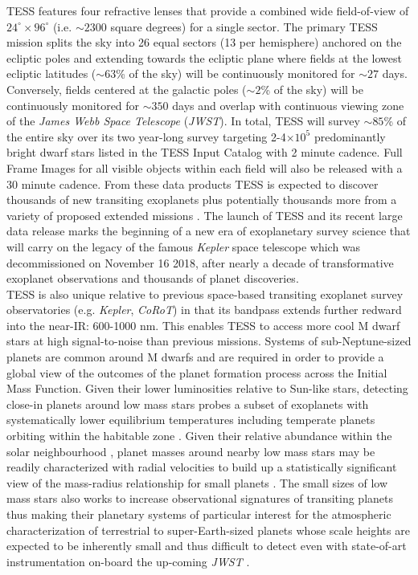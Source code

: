 TESS features four refractive lenses that provide a combined wide field-of-view of
$24^{\circ} \times 96^{\circ}$ (i.e. $\sim 2300$ square degrees) for a single sector. The primary
TESS mission splits the sky into 26 equal sectors (13 per hemisphere) anchored on the ecliptic
poles and extending towards the ecliptic plane where fields at the lowest ecliptic latitudes
($\sim 63$\% of the sky) will be continuously monitored for $\sim 27$ days. Conversely, fields
centered at the galactic poles ($\sim 2$\% of the sky) will be continuously monitored for
$\sim 350$ days and overlap with continuous viewing zone of the \emph{James Webb Space Telescope}
(\emph{JWST}). In total,  
TESS will survey $\sim 85$\% of the entire sky over its two year-long survey targeting
2-4$\times 10^5$ predominantly bright dwarf stars listed in the TESS Input Catalog
\citep[TIC;][]{stassun17} with 2 minute cadence.
Full Frame Images for all visible objects within each field will also be released with a 30 minute
cadence. From these data products TESS
is expected to discover thousands of new transiting exoplanets 
\citep{sullivan15,ballard18,barclay18} plus potentially thousands more from a variety of proposed
extended missions \citep{bouma17,huang18b}. The launch of TESS
and its recent large data release marks the beginning of a new era of exoplanetary survey
science that will carry on the legacy of the famous \emph{Kepler} space telescope which was
decommissioned on November 16 2018, after nearly a decade of transformative exoplanet observations
and thousands of planet discoveries. \\

TESS is also unique relative to previous space-based transiting exoplanet survey observatories
(e.g. \emph{Kepler}, \emph{CoRoT}) in that its bandpass extends further redward into the near-IR:
600-1000 nm. This enables TESS to access more cool M dwarf stars at high signal-to-noise
than previous missions. Systems of sub-Neptune-sized planets are common around M dwarfs
\citep{dressing13,morton14,dressing15a} and are required in order to provide a global view of the
outcomes of the planet formation process across the Initial Mass Function.
Given their lower luminosities relative
to Sun-like stars, detecting close-in planets around low mass stars probes a subset of exoplanets
with systematically lower equilibrium temperatures including temperate planets orbiting
within the habitable zone \citep{kasting93,kopparapu13}. Given their relative
abundance within the solar neighbourhood \citep{winters15}, planet masses around nearby low mass
stars may be
readily characterized with radial velocities to build up a statistically significant view of the
mass-radius relationship for small planets \citep{weiss14,rogers15,wolfgang16,chen17}. The small sizes
of low mass stars also works to
increase observational signatures of transiting planets thus making their planetary systems of
particular interest for the atmospheric characterization of terrestrial to super-Earth-sized planets
whose scale heights are expected to be inherently small \citep[$\lesssim$][]{millerricci09}
and thus difficult to detect even with state-of-art instrumentation on-board the up-coming
\emph{JWST} \citep{morley17}. \\

